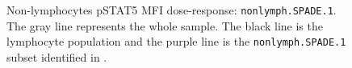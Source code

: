 \begin{figure}
\begin{minipage}{.5\textwidth}
\end{minipage}
\begin{minipage}{.3\textwidth}
{ Non-lymphocytes pSTAT5 MFI dose-response: \texttt{nonlymph.SPADE.1}. }
{
    The gray line represents the whole sample.
    The black line is the lymphocyte population and the purple line is the \texttt{nonlymph.SPADE.1} subset identified in .
}
\end{minipage}
\end{figure}


\clearpage



%
%
%
%
%
%
